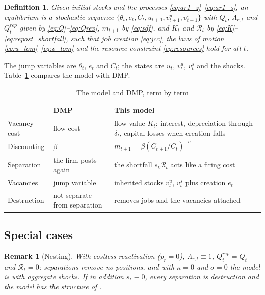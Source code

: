 \documentclass[authoryear, review, 12pt]{elsarticle}
\newtheorem{remark}{Remark}
\newtheorem{definition}{Definition}
\begin{document}
\begin{definition}
Given initial stocks and the processes \eqref{eq:ar1_z}--\eqref{eq:ar1_s}, an equilibrium is a stochastic sequence $\{\theta_t, e_t, C_t, u_{t+1}, v^u_{t+1}, v^s_{t+1}\}$ with $Q_t$, $\Lambda_{r,t}$ and $Q_t^{rep}$ given by \eqref{eq:Q}--\eqref{eq:Qrep}, $m_{t+1}$ by \eqref{eq:sdf}, and $K_t$ and $\mathcal{R}_t$ by \eqref{eq:K}--\eqref{eq:repost_shortfall}, such that job creation \eqref{eq:jcc}, the laws of motion \eqref{eq:u_lom}--\eqref{eq:v_lom} and the resource constraint \eqref{eq:resources} hold for all $t$.
\end{definition}

The jump variables are $\theta_t$, $e_t$ and $C_t$; the states are $u_t$, $v^u_t$, $v^s_t$ and the shocks. Table~\ref{tab:dmp} compares the model with DMP.

\begin{table}[H]
\centering
\caption{The model and DMP, term by term}\label{tab:dmp}
\small
\begin{tabular}{p{3.2cm}p{4.5cm}p{6.8cm}}
\toprule
 & DMP & This model \\
\midrule
Vacancy cost & flow cost & flow value $K_t$: interest, depreciation through $\delta_t$, capital losses when creation falls \\
Discounting & $\beta$ & $m_{t+1}=\beta(C_{t+1}/C_t)^{-\sigma}$ \\
Separation & the firm posts again & the shortfall $s_t\mathcal{R}_t$ acts like a firing cost \\
Vacancies & jump variable & inherited stocks $v^u_t$, $v^s_t$ plus creation $e_t$ \\
Destruction & not separate from separation & removes jobs and the vacancies attached \\
\bottomrule
\end{tabular}
\end{table}

\subsection{Special cases}

\begin{remark}[Nesting]\label{rem:nesting}
With costless reactivation ($p_r=0$), $\Lambda_{r,t}\equiv1$, $Q_t^{rep}=Q_t$ and $\mathcal{R}_t=0$: separations remove no positions, and with $\kappa=0$ and $\sigma=0$ the model is \citet{gabrovski_2025} with aggregate shocks. If in addition $s_t\equiv0$, every separation is destruction and the model has the structure of \citet{coles_2018}.
\end{remark}
\end{document}
